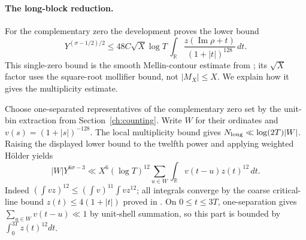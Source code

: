 \documentclass[11pt,a4paper,oneside]{article}
\theoremstyle{definition}
\newcommand{\R}{\mathbb R}
\newcommand{\Ima}{\operatorname{Im}}
\numberwithin{equation}{section}
\begin{document}
\paragraph{The long-block reduction.}
For the complementary zero the development proves the lower bound
\[
 Y^{(\sigma-1/2)/2}\le48C\sqrt X\log T\,
       \int_\R\frac{z(\Ima\rho+t)}{(1+|t|)^{128}}\,dt.
\]
This single-zero bound is the smooth Mellin-contour estimate from \cite{Lewko}; its $\sqrt X$ factor uses the square-root mollifier bound, not $|M_X|\le X$. We explain how it gives the multiplicity estimate.

Choose one-separated representatives of the complementary zero set by the unit-bin extraction from Section~\ref{ch:counting}. Write $W$ for their ordinates and $v(s)=(1+|s|)^{-128}$. The local multiplicity bound gives $N_{\rm long}\ll\log(2T)|W|$. Raising the displayed lower bound to the twelfth power and applying weighted H\"older yields
\[
 |W|Y^{6\sigma-3}\ll X^6(\log T)^{12}
 \sum_{u\in W}\int_\R v(t-u)z(t)^{12}\,dt.
\]
Indeed $(\int vz)^{12}\le(\int v)^{11}\int vz^{12}$; all integrals converge by the coarse critical-line bound $z(t)\le4(1+|t|)$ proved in \cite{Lewko}. On $0\le t\le3T$, one-separation gives $\sum_{u\in W}v(t-u)\ll1$ by unit-shell summation, so this part is bounded by $\int_0^{3T}z(t)^{12}dt$.
\end{document}
